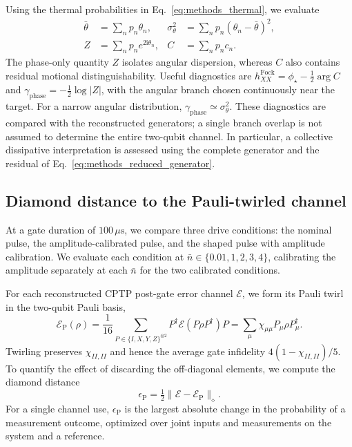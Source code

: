 \documentclass[a4paper,11pt]{article}
\newcommand{\ii}{\mathrm{i}}
\begin{document}
Using the thermal probabilities in Eq.~\eqref{eq:methods_thermal}, we
evaluate
\begin{align}
 \bar\theta&=\sum_n p_n\theta_n,
 &\sigma_\theta^2&=\sum_n p_n(\theta_n-\bar\theta)^2,\\
 Z&=\sum_n p_n e^{2\ii\theta_n},
 &C&=\sum_n p_n c_n.
\end{align}
The phase-only quantity $Z$ isolates angular dispersion, whereas $C$
also contains residual motional distinguishability. Useful diagnostics
are $h_{XX}^{\mathrm{Fock}}=\phi_\star-\tfrac12\arg C$ and
$\gamma_{\mathrm{phase}}=-\tfrac12\log|Z|$, with the angular branch
chosen continuously near the target. For a narrow angular distribution,
$\gamma_{\mathrm{phase}}\simeq\sigma_\theta^2$.
These diagnostics are compared with the reconstructed generators; a
single branch overlap is not assumed to determine the entire two-qubit
channel. In particular, a collective dissipative interpretation is
assessed using the complete generator and the residual of
Eq.~\eqref{eq:methods_reduced_generator}.

\subsection{Diamond distance to the Pauli-twirled channel}
\label{subsec:pauli_comparison}

At a gate duration of $100\,\mu\mathrm{s}$, we compare three drive
conditions: the nominal pulse, the amplitude-calibrated pulse, and the
shaped pulse with amplitude calibration. We evaluate each condition at
$\bar n\in\{0.01,1,2,3,4\}$, calibrating the amplitude separately at
each $\bar n$ for the two calibrated conditions.

For each reconstructed CPTP post-gate error channel $\mathcal E$, we
form its Pauli twirl in the two-qubit Pauli basis,
\begin{equation}
 \mathcal E_{\mathrm P}(\rho)
 =\frac{1}{16}\sum_{P\in\{I,X,Y,Z\}^{\otimes 2}}
 P^\dagger\mathcal E(P\rho P^\dagger)P
 =\sum_\mu\chi_{\mu\mu}P_\mu\rho P_\mu^\dagger .
 \label{eq:methods_twirl}
\end{equation}
Twirling preserves $\chi_{II,II}$ and hence the average gate
infidelity $4(1-\chi_{II,II})/5$. To quantify the effect of discarding
the off-diagonal elements, we compute the diamond distance
\begin{equation}
 \epsilon_{\mathrm P}
 =\tfrac12\lVert\mathcal E-\mathcal E_{\mathrm P}\rVert_\diamond .
 \label{eq:methods_diamond}
\end{equation}
For a single channel use, $\epsilon_{\mathrm P}$ is the largest absolute
change in the probability of a measurement outcome, optimized over joint
inputs and measurements on the system and a reference.
\end{document}
